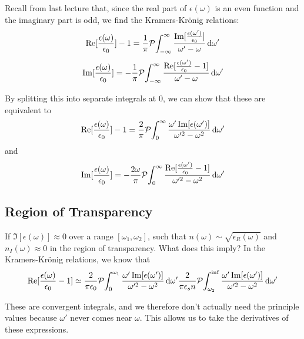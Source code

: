 \documentclass[a4paper,twoside,master.tex]{subfiles}
\begin{document}

Recall from last lecture that, since the real part of $ \epsilon(\omega) $ is an even function and the imaginary part is odd, we find the Kramers-Kr\"onig relations:
\begin{equation}
    \Re[\frac{\epsilon(\omega)}{\epsilon_0}] - 1 = \frac{1}{\pi} \pv{\int_{- \infty}^{\infty} \frac{\Im[\frac{\epsilon(\omega')}{\epsilon_0}]}{\omega' - \omega} \dd{\omega'}}
\end{equation}
\begin{equation}
    \Im[\frac{\epsilon(\omega)}{\epsilon_0}] = - \frac{1}{\pi} \pv{\int_{- \infty}^{\infty} \frac{\Re[\frac{\epsilon(\omega')}{\epsilon_0} - 1]}{\omega' - \omega} \dd{\omega'}}
\end{equation}

By splitting this into separate integrals at $ 0 $, we can show that these are equivalent to
\begin{equation}
    \Re[\frac{\epsilon(\omega)}{\epsilon_0}] - 1 = \frac{2}{\pi} \pv{\int_{0}^{\infty} \frac{\omega' \Im[\epsilon(\omega')]}{\omega'^2 - \omega^2} \dd{\omega'}}
\end{equation}
and
\begin{equation}
    \Im[\frac{\epsilon(\omega)}{\epsilon_0}] = - \frac{2 \omega}{\pi} \pv{\int_0^{\infty} \frac{\Re[\frac{\epsilon(\omega')}{\epsilon_0} - 1]}{\omega'^2 - \omega^2} \dd{\omega'}}
\end{equation}

\subsection{Region of Transparency}
\label{sub:region_of_transparency}

If $ \Im[\epsilon(\omega)] \approx 0 $ over a range $ [\omega_1, \omega_2] $, such that $ n(\omega) \sim \sqrt{\epsilon_R(\omega)} $ and $ n_I(\omega) \approx 0 $ in the region of transparency. What does this imply? In the Kramers-Kr\"onig relations, we know that
\begin{equation}
    \Re[\frac{\epsilon(\omega)}{\epsilon_0} - 1] \simeq \frac{2}{\pi\epsilon_0} \pv{\int_0^{\omega_1} \frac{\omega' \Im[\epsilon(\omega')]}{\omega'^2 - \omega^2} \dd{\omega'}} \frac{2}{\pi\epsilon_sn}\pv{\int_{\omega_2}^{\inf} \frac{\omega' \Im[\epsilon(\omega')]}{\omega'^2 - \omega^2} \dd{\omega'}}
\end{equation}

These are convergent integrals, and we therefore don't actually need the principle values because $ \omega' $ never comes near $ \omega $. This allows us to take the derivatives of these expressions.
\end{document}
